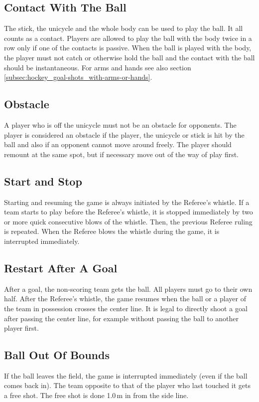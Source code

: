 \subsection{Contact With The Ball}
The stick, the unicycle and the whole body can be used to play the ball.
It all counts as a contact.
Players are allowed to play the ball with the body twice in a row only if one of the contacts is passive.
When the ball is played with the body, the player must not catch or otherwise hold the ball and the contact with the ball should be instantaneous.
For arms and hands see also section \ref{subsec:hockey_goal-shots_with-arms-or-hands}.

\subsection{Obstacle}
A player who is off the unicycle must not be an obstacle for opponents.
The player is considered an obstacle if the player, the unicycle or stick is hit by the ball and also if an opponent cannot move around freely.
The player should remount at the same spot, but if necessary move out of the way of play first.

\subsection{Start and Stop}
Starting and resuming the game is always initiated by the Referee's whistle.
If a team starts to play before the Referee's whistle, it is stopped immediately by two or more quick consecutive blows of the whistle.
Then, the previous Referee ruling is repeated.
When the Referee blows the whistle during the game, it is interrupted immediately.

\subsection{Restart After A Goal}
After a goal, the non-scoring team gets the ball.
All players must go to their own half.
After the Referee's whistle, the game resumes when the ball or a player of the team in possession crosses the center line.
It is legal to directly shoot a goal after passing the center line, for example without passing the ball to another player first.

\subsection{Ball Out Of Bounds}
If the ball leaves the field, the game is interrupted immediately (even if the ball comes back in).
The team opposite to that of the player who last touched it gets a free shot.
The free shot is done 1.0\,m in from the side line.

